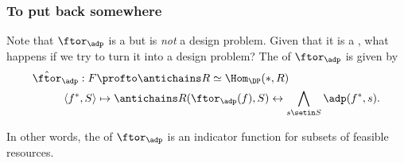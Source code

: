 \subsubsection{To put back somewhere}
Note that $\ftor_\adp$ is a  but is \emph{not} a design problem.
Given that it is a , what happens if we try to turn it into a design problem?
The  of $\ftor_\adp$ is given by
\begin{equation}
    \begin{aligned}
        \hat \ftor_\adp : F    & \profto \antichains R \simeq \Hom_\DP(\ast, R) \\
        \langle f^*, S \rangle & \mapsto \antichains R(\ftor_\adp(f), S) \leftrightarrow \bigwedge_{s\setin S} \adp(f^*, s).
    \end{aligned}
\end{equation}

In other words, the  of $\ftor_\adp$ is an indicator function for subsets of feasible resources.
